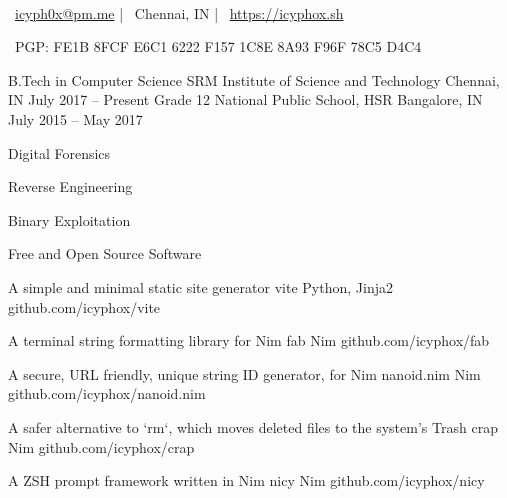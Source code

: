 \documentclass[]{awesome-cv}
\begin{document}
    
\begin{center}
	  \\
	\vspace{2mm}
	{\faEnvelope\ \href{mailto:icyph0x@pm.me}{icyph0x@pm.me}} | {\faMapMarker\ Chennai, IN} | {\faLink\ \url{https://icyphox.sh}}
	\begin{center}
		{\faKey\ PGP: FE1B 8FCF E6C1 6222 F157 1C8E 8A93 F96F 78C5 D4C4}
	\end{center} 
\end{center} 


\begin{cventries}
	\cventry
	{B.Tech in Computer Science}
	{SRM Institute of Science and Technology}
	{Chennai, IN}
	{July 2017 – Present}
	{}
	\cventry
	{Grade 12}
	{National Public School, HSR}
	{Bangalore, IN}
	{July 2015 – May 2017}
	{}
\end{cventries}


\vspace{-6mm}
\vspace{3mm}
	{\begin{cvitems}
		\item {Digital Forensics}
		\item {Reverse Engineering}
		\item {Binary Exploitation}
		\item {Free and Open Source Software}
	\end{cvitems}}

\begin{cventries}
	\cventry
	{A simple and minimal static site generator}
	{vite}
	{Python, Jinja2}
	{github.com/icyphox/vite}
	{}
	
	\vspace{-5mm}
	\cventry
	{A terminal string formatting library for Nim}
	{fab}
	{Nim}
	{github.com/icyphox/fab}
	{}

	\vspace{-5mm}
	\cventry
	{A secure, URL friendly, unique string ID generator, for Nim}
	{nanoid.nim}
	{Nim}
	{github.com/icyphox/nanoid.nim}
	{}

	\vspace{-5mm}
	\cventry
	{A safer alternative to `rm`, which moves deleted files to the system's Trash}  
	{crap}
	{Nim}
	{github.com/icyphox/crap}
	{}
	
	\vspace{-5mm}
	\cventry
	{A ZSH prompt framework written in Nim}
	{nicy}
	{Nim}
	{github.com/icyphox/nicy}
	{}

	\vspace {-5mm}

\end{cventries}
\end{document}
